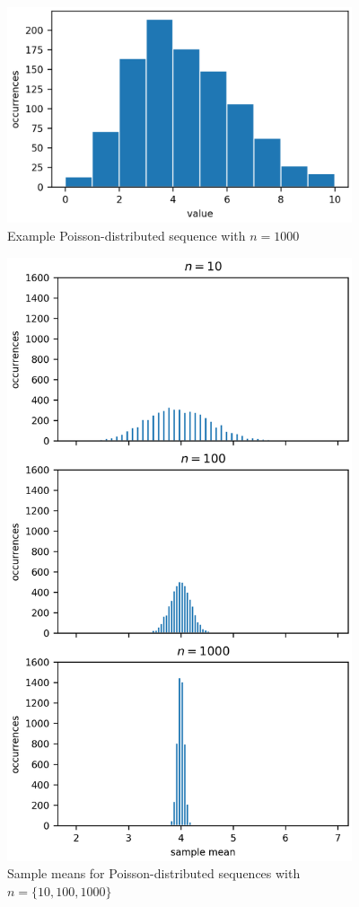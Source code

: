 \documentclass[11pt]{article}
\begin{document}
\subsection{}  %
\begin{figure}[H]
    \centering
    \includegraphics[width=4in]{4bfig1.png}
    \caption{Example Poisson-distributed sequence with $n=1000$}
    \label{4bfig1}
\end{figure}
\begin{figure}[H]
    \centering
    \includegraphics[width=4in]{4bfig2.png}
    \caption{Sample means for Poisson-distributed sequences with $n=\{10, 100, 1000\}$}
    \label{4bfig2}
\end{figure}
\end{document}
